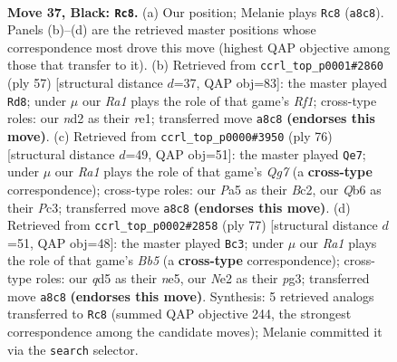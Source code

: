 \documentclass[11pt]{article}
\begin{document}
\clearpage

\begin{figure}[p]\centering
\begin{subfigure}{0.46\textwidth}\centering
\resizebox{\linewidth}{!}{%
\newchessgame
\chessboard[
  setfen={r5k1/1p3p2/1q4p1/p2Q4/7p/7P/P2NnPP1/b6K b - - 2 37},
  showmover=false,
  pgfstyle=straightmove, color=movearrow, markmove={a8-c8}
]}
\caption{}
\end{subfigure}\hfill
\begin{subfigure}{0.46\textwidth}\centering
\resizebox{\linewidth}{!}{%
\newchessgame
\chessboard[
  setfen={5r1k/5pp1/2p4p/p4q2/8/P1Q5/1P3PPP/4R1K1 b - - 0 29},
  showmover=false,
  pgfstyle=straightmove, color=movearrow, markmove={f8-d8}
]}
\caption{}
\end{subfigure}
\\[4pt]
\begin{subfigure}{0.46\textwidth}\centering
\resizebox{\linewidth}{!}{%
\newchessgame
\chessboard[
  setfen={8/kp4Q1/p5P1/3p1p2/P1nP4/2P5/2B2qPK/8 w - - 0 39},
  showmover=false,
  pgfstyle=straightmove, color=movearrow, markmove={g7-e7}
]}
\caption{}
\end{subfigure}\hfill
\begin{subfigure}{0.46\textwidth}\centering
\resizebox{\linewidth}{!}{%
\newchessgame
\chessboard[
  setfen={4q1k1/5pp1/7p/p2QN2P/1b6/1P4P1/5P2/5K2 b - - 11 39},
  showmover=false,
  pgfstyle=straightmove, color=movearrow, markmove={b4-c3}
]}
\caption{}
\end{subfigure}
\caption{\textbf{Move 37, Black: \texttt{Rc8}.} (a) Our position; Melanie plays \texttt{Rc8} (\texttt{a8c8}). Panels (b)--(d) are the retrieved master positions whose correspondence most drove this move (highest QAP objective among those that transfer to it). (b) Retrieved from \texttt{ccrl\_top\_p0001\#2860} (ply 57) [structural distance $d$=37, QAP obj=83]: the master played \texttt{Rd8}; under $\mu$ our \emph{Ra1} plays the role of that game's \emph{Rf1}; cross-type roles: our \emph{n}d2 as their \emph{r}e1; transferred move \texttt{a8c8} \textbf{(endorses this move)}. (c) Retrieved from \texttt{ccrl\_top\_p0000\#3950} (ply 76) [structural distance $d$=49, QAP obj=51]: the master played \texttt{Qe7}; under $\mu$ our \emph{Ra1} plays the role of that game's \emph{Qg7} (a \textbf{cross-type} correspondence); cross-type roles: our \emph{P}a5 as their \emph{B}c2, our \emph{Q}b6 as their \emph{P}c3; transferred move \texttt{a8c8} \textbf{(endorses this move)}. (d) Retrieved from \texttt{ccrl\_top\_p0002\#2858} (ply 77) [structural distance $d$=51, QAP obj=48]: the master played \texttt{Bc3}; under $\mu$ our \emph{Ra1} plays the role of that game's \emph{Bb5} (a \textbf{cross-type} correspondence); cross-type roles: our \emph{q}d5 as their \emph{n}e5, our \emph{N}e2 as their \emph{p}g3; transferred move \texttt{a8c8} \textbf{(endorses this move)}. Synthesis: 5 retrieved analogs transferred to \texttt{Rc8} (summed QAP objective 244, the strongest correspondence among the candidate moves); Melanie committed it via the \texttt{search} selector.}
\label{fig:thought-m73}
\end{figure}
\end{document}
